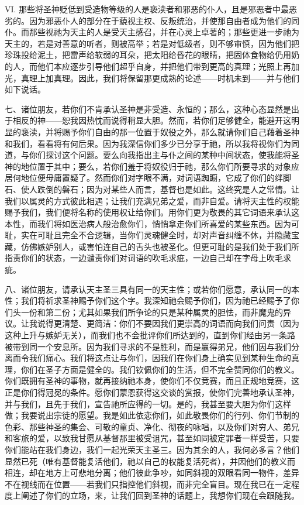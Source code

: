 VI. 那些将圣神贬低到受造物等级的人是亵渎者和邪恶的仆人，且是邪恶者中最恶劣的。因为邪恶仆人的部分在于藐视主权、反叛统治，并使那自由者成为他们的同仆。而那些视祂为天主的人是受天主感召，并在心灵上卓著的；那些更进一步祂为天主的，若是对善意的听者，则被高举；若是对低级者，则不够审慎，因为他们把珍珠投给泥土，把雷声给软弱的耳朵，把太阳给昏花的眼睛，把固体食物给仍用奶的人，而他们本应逐步引导他们超乎自身，并把他们带到更高的真理；光照上再加光，真理上加真理。因此，我们将保留那更成熟的论述——时机未到——并与他们如下说话。\par

七、诸位朋友，若你们不肯承认圣神是非受造、永恒的；那么，这种心态显然是出于相反的神——恕我因热忱而说得稍显大胆。然而，若你们足够健全，能避开这明显的亵渎，并将赐予你们自由的那一位置于奴役之外，那么就请你们自己藉着圣神和我们，看看将有何后果。因为我深信你们多少已分享于祂，所以我将视你们为同道，与你们探讨这个问题。要么向我指出主与仆之间的某种中间状态，使我能将圣神的地位置于其中；要么，若你们羞于将奴役归于祂，那么你们所要寻求的对象应居何地位便毋庸置疑了。然而你们对字眼不满，对词语踟蹰，它成了你们的绊脚石、使人跌倒的磐石；因为对某些人而言，基督也是如此。这终究是人之常情。让我们以属灵的方式彼此相遇；让我们充满兄弟之爱，而非自爱。请将天主性的权能赐予我们，我们便将名称的使用权让给你们。用你们更为敬畏的其它词语来承认这本性，而我们将如医治病人般治愈你们，悄悄拿走你们所喜爱的某些东西。因为可耻，实在可耻且完全不合逻辑，当你们灵魂健全时，却对声音纠缠不休，并隐藏宝藏，仿佛嫉妒别人，或害怕连自己的舌头也被圣化。但更可耻的是我们处于我们所指责你们的状态，一边谴责你们对词语的吹毛求疵，一边自己却在字母上吹毛求疵。\par

八、诸位朋友，请承认天主圣三具有同一的天主性；或若你们愿意，承认同一的本性；我们将祈求圣神赐予你们这个字。我深知祂会赐予你们，因为祂已经赐予了你们头一份和第二份；尤其如果我们所争论的只是某种属灵的胆怯，而非魔鬼的异议。让我说得更清楚、更简洁：你们不要因我们更崇高的词语而向我们问责（因为这种上升与嫉妒无关），而我们也不会批评你们所达到的，直到你们经由另一条路被带到同一个安息所。因为我们寻求的不是胜利，而是赢得弟兄，他们因与我们分离而令我们痛心。我们将这点让与你们，因我们在你们身上确实见到某种生命的真理，你们在圣子方面是健全的。我们钦佩你们的生活，但不完全赞同你们的教义。你们既拥有圣神的事物，就再接纳祂本身，使你们不仅竞赛，而且正规地竞赛，这正是你们得冠冕的条件。愿你们蒙恩获得这交谈的赏报，使你们完善地承认圣神，并与我们，且先于我们，宣告祂所应得的一切。是的，我甚至要大胆为你们这样做；我要说出宗徒的愿望。我是如此依恋你们，如此敬畏你们的行列、你们节制的色彩、那些神圣的集会、可敬的童贞、净化、彻夜的咏唱，以及你们对穷人、弟兄和客旅的爱，以致我甘愿从基督那里被受诅咒，甚至如同被定罪者一样受苦，只要你们能站在我们身边，我们一起光荣天主圣三。因为其余的人，我何必多言？他们显然已死（唯有基督能复活他们，祂以自己的权能复活死者），并因他们的教义而相连，却在地方上可悲地分离；他们彼此争吵，如同斜视的双眼看同一物件，差异不在视线而在位置——若我们只指控他们斜视，而非完全盲目。现在我已在一定程度上阐述了你们的立场，来，让我们回到圣神的话题上，我想你们现在会跟随我。\par

